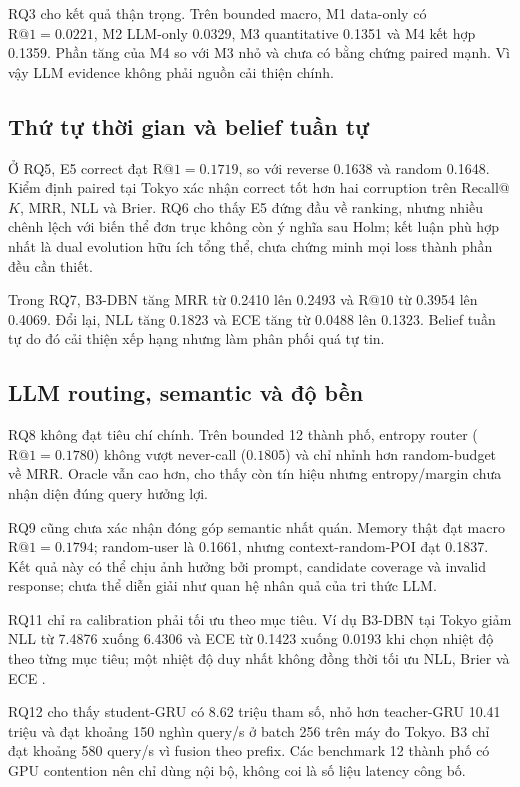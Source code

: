 \documentclass[runningheads]{llncs}
\makeatletter
\newcommand{\Rone}{\mathrm{R@1}}
\newcommand{\Rten}{\mathrm{R@10}}
\makeatother
\begin{document}
RQ3 cho kết quả thận trọng. Trên bounded macro, M1 data-only có $\Rone=0.0221$, M2 LLM-only 0.0329, M3 quantitative 0.1351 và M4 kết hợp 0.1359. Phần tăng của M4 so với M3 nhỏ và chưa có bằng chứng paired mạnh. Vì vậy LLM evidence không phải nguồn cải thiện chính.

\subsection{Thứ tự thời gian và belief tuần tự}

Ở RQ5, E5 correct đạt $\Rone=0.1719$, so với reverse 0.1638 và random 0.1648. Kiểm định paired tại Tokyo xác nhận correct tốt hơn hai corruption trên Recall@$K$, MRR, NLL và Brier. RQ6 cho thấy E5 đứng đầu về ranking, nhưng nhiều chênh lệch với biến thể đơn trục không còn ý nghĩa sau Holm; kết luận phù hợp nhất là dual evolution hữu ích tổng thể, chưa chứng minh mọi loss thành phần đều cần thiết.

Trong RQ7, B3-DBN tăng MRR từ 0.2410 lên 0.2493 và $\Rten$ từ 0.3954 lên 0.4069. Đổi lại, NLL tăng 0.1823 và ECE tăng từ 0.0488 lên 0.1323. Belief tuần tự do đó cải thiện xếp hạng nhưng làm phân phối quá tự tin.

\subsection{LLM routing, semantic và độ bền}

RQ8 không đạt tiêu chí chính. Trên bounded 12 thành phố, entropy router ($\Rone=0.1780$) không vượt never-call ($0.1805$) và chỉ nhỉnh hơn random-budget về MRR. Oracle vẫn cao hơn, cho thấy còn tín hiệu nhưng entropy/margin chưa nhận diện đúng query hưởng lợi.

RQ9 cũng chưa xác nhận đóng góp semantic nhất quán. Memory thật đạt macro $\Rone=0.1794$; random-user là 0.1661, nhưng context-random-POI đạt 0.1837. Kết quả này có thể chịu ảnh hưởng bởi prompt, candidate coverage và invalid response; chưa thể diễn giải như quan hệ nhân quả của tri thức LLM.

RQ11 chỉ ra calibration phải tối ưu theo mục tiêu. Ví dụ B3-DBN tại Tokyo giảm NLL từ 7.4876 xuống 6.4306 và ECE từ 0.1423 xuống 0.0193 khi chọn nhiệt độ theo từng mục tiêu; một nhiệt độ duy nhất không đồng thời tối ưu NLL, Brier và ECE \cite{guo2017calibration}.

RQ12 cho thấy student-GRU có 8.62 triệu tham số, nhỏ hơn teacher-GRU 10.41 triệu và đạt khoảng 150 nghìn query/s ở batch 256 trên máy đo Tokyo. B3 chỉ đạt khoảng 580 query/s vì fusion theo prefix. Các benchmark 12 thành phố có GPU contention nên chỉ dùng nội bộ, không coi là số liệu latency công bố.
\end{document}
